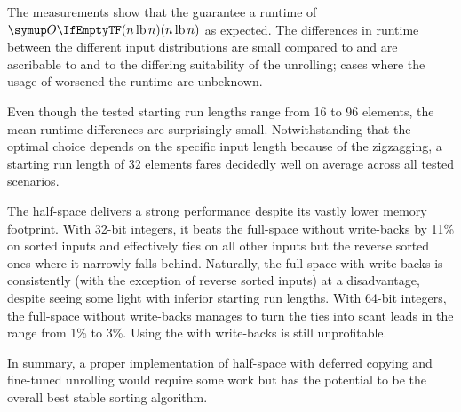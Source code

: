 The measurements show that the \MS*{} guarantee a runtime of \(\bigoh{n \lb n}\) as expected.
The differences in runtime between the different input distributions are small compared to \QS{} and are ascribable to \ShS{} and to the differing suitability of the unrolling;
cases where the usage of \ShS{} worsened the runtime are unbeknown.

Even though the tested starting run lengths range from 16 to 96 elements, the mean runtime differences are surprisingly small.
Notwithstanding that the optimal choice depends on the specific input length because of the zigzagging, a starting run length of 32 elements fares decidedly well on average across all tested scenarios.

The half-space \MS{} delivers a strong performance despite its vastly lower memory footprint.
With 32-bit integers, it beats the full-space \MS{} without write-backs by 11\% on sorted inputs and effectively ties on all other inputs but the reverse sorted ones where it narrowly falls behind.
Naturally, the full-space \MS{} with write-backs is consistently (with the exception of reverse sorted inputs) at a disadvantage, despite seeing some light with inferior starting run lengths.
With 64-bit integers, the full-space \MS{} without write-backs manages to turn the ties into scant leads in the range from 1\% to 3\%.
Using the \MS{} with write-backs is still unprofitable.

In summary, a proper implementation of half-space \MS{} with deferred copying and fine-tuned unrolling would require some work but has the potential to be the overall best stable sorting algorithm.

